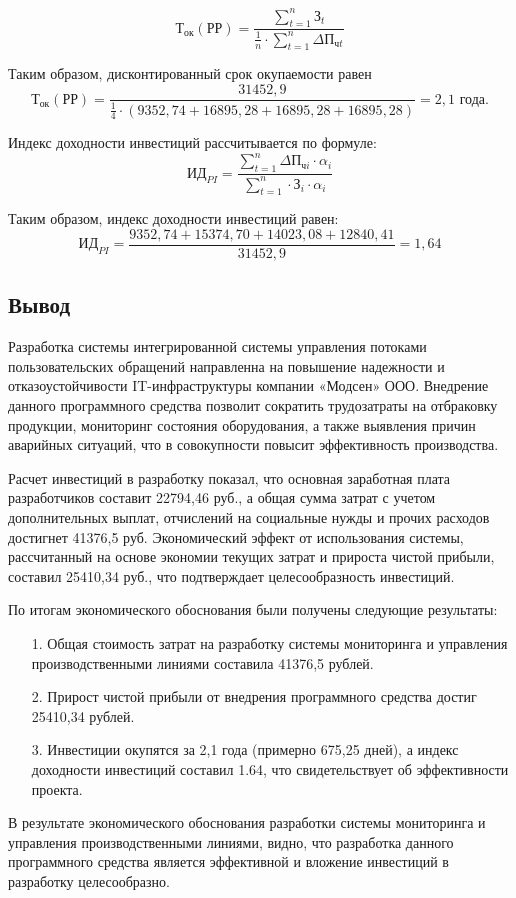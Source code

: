 \begin{equation}
    \text{Т}_\text{ок}(\text{РР})=\frac{\sum_{t=1}^{n}\text{З}_t}{\frac{1}{n}\cdot\sum_{t=1}^{n}\Delta\text{П}_{\text{ч}t}}
\end{equation}

Таким образом, дисконтированный срок окупаемости равен
$$
\text{Т}_\text{ок}(\text{РР})=\frac{31452,9}{\frac{1}{4}\cdot(9352,74+16895,28+16895,28+16895,28)} = 2,1 \text{ года.}
$$

Индекс доходности инвестиций рассчитывается по формуле:
\begin{equation}
    \text{ИД}_{PI}=\frac{\sum_{t=1}^{n}\Delta\text{П}_{\text{ч}i}\cdot \alpha _i}{\sum_{t=1}^{n}\cdot \text{З}_i \cdot \alpha _i}
\end{equation}

Таким образом, индекс доходности инвестиций равен:
$$
\text{ИД}_{PI}=\frac{9352,74+15374,70+14023,08+12840,41}{31452,9} = 1,64
$$

\subsection{Вывод}

Разработка системы интегрированной системы управления потоками
пользовательских обращений направленна на повышение надежности и
отказоустойчивости IT-инфраструктуры компании «Модсен» ООО.
Внедрение данного программного средства позволит сократить трудозатраты
на отбраковку продукции, мониторинг состояния оборудования, а также
выявления причин аварийных ситуаций, что в совокупности повысит
эффективность производства.

Расчет инвестиций в разработку показал, что основная заработная плата
разработчиков составит 22794,46 руб., а общая сумма затрат с учетом дополнительных выплат, отчислений на социальные нужды и прочих расходов достигнет 41376,5 руб. Экономический эффект от использования системы, рассчитанный на основе экономии текущих затрат и прироста чистой прибыли, составил 25410,34 руб., что подтверждает целесообразность инвестиций.

По итогам экономического обоснования были получены следующие результаты:
\begin{enumerate}
\item[1.] Общая стоимость затрат на разработку системы мониторинга и управления производственными линиями составила 41376,5 рублей.
\item[2.] Прирост чистой прибыли от внедрения программного средства достиг 25410,34 рублей.
\item[3.] Инвестиции окупятся за 2,1 года (примерно 675,25 дней), а индекс доходности инвестиций составил 1.64, что свидетельствует об эффективности проекта.
\end{enumerate}

В результате экономического обоснования разработки системы мониторинга и управления производственными линиями, видно, что разработка данного программного средства является эффективной и вложение инвестиций в разработку целесообразно.